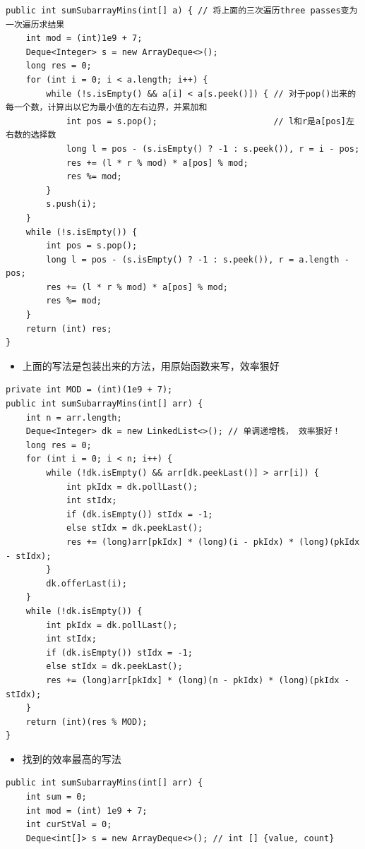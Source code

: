 \documentclass[9pt, b5paaper]{book}
\begin{document}
\begin{enumerate}
\begin{verbatim}
public int sumSubarrayMins(int[] a) { // 将上面的三次遍历three passes变为一次遍历求结果
    int mod = (int)1e9 + 7;
    Deque<Integer> s = new ArrayDeque<>();
    long res = 0;
    for (int i = 0; i < a.length; i++) {
        while (!s.isEmpty() && a[i] < a[s.peek()]) { // 对于pop()出来的每一个数，计算出以它为最小值的左右边界，并累加和
            int pos = s.pop();                       // l和r是a[pos]左右数的选择数
            long l = pos - (s.isEmpty() ? -1 : s.peek()), r = i - pos;
            res += (l * r % mod) * a[pos] % mod;
            res %= mod;
        }
        s.push(i);
    }
    while (!s.isEmpty()) {
        int pos = s.pop();
        long l = pos - (s.isEmpty() ? -1 : s.peek()), r = a.length - pos;
        res += (l * r % mod) * a[pos] % mod;
        res %= mod;
    }
    return (int) res;
}
\end{verbatim}
\begin{itemize}
\item 上面的写法是包装出来的方法，用原始函数来写，效率狠好
\end{itemize}
\begin{verbatim}
private int MOD = (int)(1e9 + 7);
public int sumSubarrayMins(int[] arr) {
    int n = arr.length;
    Deque<Integer> dk = new LinkedList<>(); // 单调递增栈， 效率狠好！
    long res = 0;
    for (int i = 0; i < n; i++) {
        while (!dk.isEmpty() && arr[dk.peekLast()] > arr[i]) {
            int pkIdx = dk.pollLast();
            int stIdx;
            if (dk.isEmpty()) stIdx = -1;
            else stIdx = dk.peekLast();
            res += (long)arr[pkIdx] * (long)(i - pkIdx) * (long)(pkIdx - stIdx);
        }
        dk.offerLast(i);
    }
    while (!dk.isEmpty()) {
        int pkIdx = dk.pollLast();
        int stIdx;
        if (dk.isEmpty()) stIdx = -1;
        else stIdx = dk.peekLast();
        res += (long)arr[pkIdx] * (long)(n - pkIdx) * (long)(pkIdx - stIdx);
    }
    return (int)(res % MOD);
}
\end{verbatim}
\begin{itemize}
\item 找到的效率最高的写法
\end{itemize}
\begin{verbatim}
public int sumSubarrayMins(int[] arr) {
    int sum = 0;
    int mod = (int) 1e9 + 7;
    int curStVal = 0;
    Deque<int[]> s = new ArrayDeque<>(); // int [] {value, count}

\end{verbatim}
\end{enumerate}
\end{document}
